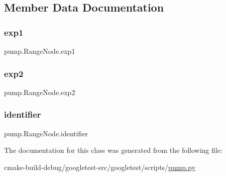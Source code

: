 \subsection{Member Data Documentation}
\mbox{\label{classpump_1_1RangeNode_acbb59f8c5e23d23563ca03f21574ce63}} 
\subsubsection{\texorpdfstring{exp1}{exp1}}
{\footnotesize\ttfamily pump.\+Range\+Node.\+exp1}

\mbox{\label{classpump_1_1RangeNode_afe153ee472b121652a51c62c1522cc13}} 
\subsubsection{\texorpdfstring{exp2}{exp2}}
{\footnotesize\ttfamily pump.\+Range\+Node.\+exp2}

\mbox{\label{classpump_1_1RangeNode_ae75b9f31ba8c3bd048cf09b22035efa0}} 
\subsubsection{\texorpdfstring{identifier}{identifier}}
{\footnotesize\ttfamily pump.\+Range\+Node.\+identifier}



The documentation for this class was generated from the following file\+:\begin{DoxyCompactItemize}
\item 
cmake-\/build-\/debug/googletest-\/src/googletest/scripts/\mbox{\hyperlink{pump_8py}{pump.\+py}}\end{DoxyCompactItemize}
